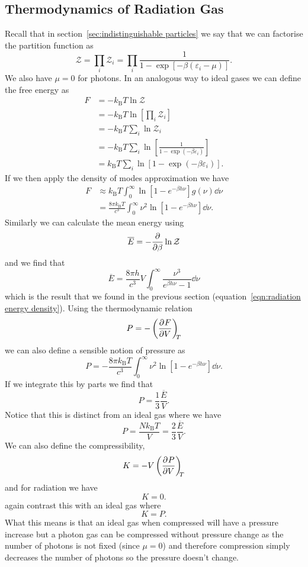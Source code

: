 \documentclass[a4paper]{article}
\newcommand{\boltzmann}{k_\mathrm{B}}
\newcommand{\mean}[1]{\overline{#1}}
\newcommand{\partition}{\mathcal{Z}}
\begin{document}
    \subsection{Thermodynamics of Radiation Gas}
    Recall that in section~\ref{sec:indistinguishable particles} we say that we can factorise the partition function as
    \[\partition = \prod_{i} \partition_{i} = \prod_{i} \frac{1}{1 - \exp[-\beta(\varepsilon_i - \mu)]}.\]
    We also have \(\mu = 0\) for photons.
    In an analogous way to ideal gases we can define the free energy as
    \begin{align*}
        F &= -\boltzmann T\ln\partition\\
        &= -\boltzmann T\ln\left[ \prod_{i}\partition_{i} \right]\\
        &= -\boltzmann T\sum_{i} \ln\partition_{i}\\
        &= -\boltzmann T\sum_{i} \ln\left[ \frac{1}{1 - \exp(-\beta\varepsilon_{i})} \right]\\
        &= \boltzmann T\sum_{i} \ln[1 - \exp(-\beta\varepsilon_{i})].
    \end{align*}
    If we then apply the density of modes approximation we have
    \begin{align*}
        F &\approx \boltzmann T \int_{0}^{\infty} \ln[1 - e^{-\beta h\nu}]g(\nu)\dd{\nu}\\
        &= \frac{8\pi\boltzmann T}{c^3} \int_{0}^{\infty} \nu^2\ln[1 - e^{-\beta h\nu}]\dd{\nu}.
    \end{align*}
    Similarly we can calculate the mean energy using
    \[\mean{E} = -\pdv{\beta}\ln\partition\]
    and we find that
    \[\mean{E} = \frac{8\pi h}{c^3}V\int_{0}^{\infty} \frac{\nu^3}{e^{\beta h\nu} -1}\dd{\nu}\]
    which is the result that we found in the previous section (equation~\ref{eqn:radiation energy density}).
    Using the thermodynamic relation
    \[P = -\left(\pdv[]{F}{V}\right)_{\!\!{T}}\]
    we can also define a sensible notion of pressure as
    \[P = -\frac{8\pi\boltzmann T}{c^3}\int_{0}^{\infty}\nu^2 \ln[1 - e^{-\beta h\nu}]\dd{\nu}.\]
    If we integrate this by parts we find that
    \[P = \frac{1}{3}\frac{\mean{E}}{V}.\tag{radiation}\]
    Notice that this is distinct from an ideal gas where we have
    \[P = \frac{N\boltzmann T}{V} = \frac{2}{3}\frac{\mean{E}}{V}. \tag{ideal gas}\]
    We can also define the compressibility,
    \[K = -V\left(\pdv[]{P}{V}\right)_{\!\!{T}}\]
    and for radiation we have
    \[K = 0. \tag{radiation}\]
    again contrast this with an ideal gas where
    \[K = P. \tag{ideal gas}\]
    What this means is that an ideal gas when compressed will have a pressure increase but a photon gas can be compressed without pressure change as the number of photons is not fixed (since \(\mu = 0\)) and therefore compression simply decreases the number of photons so the pressure doesn't change.
    
\end{document}
